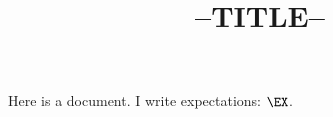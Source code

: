 \documentclass[12pt]{article}
\title{--TITLE--}
\begin{document}
\maketitle

Here is a document. I write expectations: $\EX$.
\end{document}
